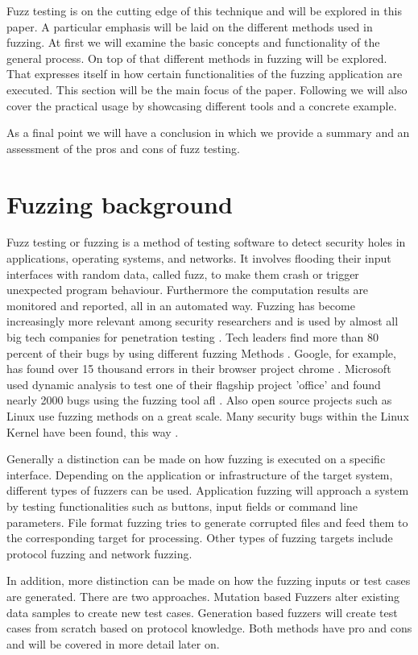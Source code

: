 \documentclass[journal=tosc,final]{iacrtrans}
\begin{document}
Fuzz testing is on the cutting edge of this technique and will be explored in this paper. A particular emphasis will be laid on the different methods used in fuzzing. 
At first we will examine the basic concepts and functionality of the general process. On top of that different methods in fuzzing will be explored. That expresses itself in how certain functionalities of the fuzzing application are executed. This section will be the main focus of the paper. Following we will also cover the practical usage by showcasing different tools and a concrete example. 

As a final point we will have a conclusion in which we provide a summary and an assessment of the pros and cons of fuzz testing. 
\newpage
\section{Fuzzing background}
Fuzz testing or fuzzing is a method of testing software to detect security holes in applications, operating systems, and networks. It involves flooding their input interfaces with random data, called fuzz, to make them crash or trigger unexpected program behaviour. Furthermore the computation results are monitored and reported, all in an automated way. Fuzzing has become increasingly more relevant among security researchers and is used by almost all big tech companies for penetration testing \cite{li2018fuzzing}. Tech leaders find more than 80 percent of their bugs by using different fuzzing Methods \cite{method}. Google, for example, has found over 15 thousand errors in their browser project chrome \cite{google}. Microsoft used dynamic analysis to test one of their flagship project 'office' and found nearly 2000 bugs using the fuzzing tool afl \cite{method}. Also open source projects such as Linux use fuzzing methods on a great scale. Many security bugs within the Linux Kernel have been found, this way \cite{code}.

Generally a distinction can be made on how fuzzing is executed on a specific interface. Depending on the application or infrastructure of the target system, different types of fuzzers can be used. Application fuzzing will approach a system by testing functionalities such as buttons, input fields or command line parameters. File format fuzzing tries to generate corrupted files and feed them to the corresponding target for processing. Other types of fuzzing targets include protocol fuzzing and network fuzzing.

In addition, more distinction can be made on how the fuzzing inputs or test cases are generated. There are two approaches. Mutation based Fuzzers alter existing data samples to create new test cases.
Generation based fuzzers will create test cases from scratch based on protocol knowledge. 
Both methods have pro and cons and will be covered in more detail later on.
\end{document}
